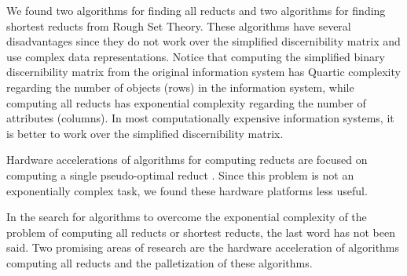\documentclass[citenumber]{llncs}
\begin{document}
    We found two algorithms for finding all reducts \cite{Starzyk00,WangP07} and two algorithms for finding shortest reducts \cite{Lin04,Jensen14} from Rough Set Theory. These algorithms have several disadvantages since they do not work over the simplified discernibility matrix and use complex data representations. Notice that computing the simplified binary discernibility matrix from the original information system has Quartic complexity regarding the number of objects (rows) in the information system, while computing all reducts has exponential complexity regarding the number of attributes (columns). In most computationally expensive information systems, it is better to work over the simplified discernibility matrix. 
    
    Hardware accelerations of algorithms for computing reducts are focused on computing a single pseudo-optimal reduct \cite{Tiwari11,Tiwari12,Tiwari13,Grzes13,Kopczynski14,Tiwari14}. Since this problem is not an exponentially complex task, we found these hardware platforms less useful.	
		    
    In the search for algorithms to overcome the exponential complexity of the problem of computing all reducts or
    shortest reducts, the last word has not been said. Two promising areas of research are the hardware acceleration of algorithms computing all reducts and the palletization of these algorithms.
  
%


\end{document}
